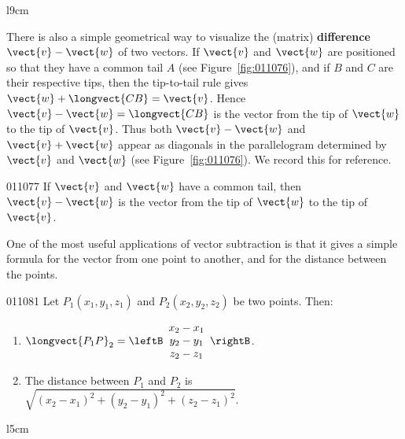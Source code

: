 \begin{wrapfigure}[7]{l}{9cm} 
\centering

\caption{\label{fig:011076}}
\end{wrapfigure}
There is also a simple geometrical way to visualize the (matrix) \textbf{difference} $\vect{v} - \vect{w}$ of two vectors. If $\vect{v}$ and $\vect{w}$ are positioned so that they have a common tail $A$ (see Figure~\ref{fig:011076}), and if $B$ and $C$ are their respective tips, then the tip-to-tail rule gives $\vect{w} + \longvect{CB} = \vect{v}$. Hence $\vect{v} - \vect{w} = \longvect{CB}$ is the vector from the tip of $\vect{w}$ to the tip of $\vect{v}$. Thus both $\vect{v} - \vect{w}$ and $\vect{v} + \vect{w}$ appear as diagonals in the parallelogram determined by $\vect{v}$ and $\vect{w}$ (see Figure~\ref{fig:011076}). We record this for reference.

\begin{theorem}{}{011077}
If $\vect{v}$ and $\vect{w}$ have a common tail, then $\vect{v} - \vect{w}$ is the vector from the tip of $\vect{w}$ to the tip of $\vect{v}$.
\end{theorem}

One of the most useful applications of vector subtraction is that it gives a  simple formula for the vector from one point to another, and for the  distance between the points. 


\begin{theorem}{}{011081}
Let $P_{1}(x_{1}, y_{1}, z_{1})$ and $P_{2}(x_{2}, y_{2}, z_{2})$ be two points. Then:

\begin{enumerate}
\item  
$\longvect{P_{1}P}_{2} = \leftB
\begin{array}{c}
x_{2} - x_{1} \\
y_{2} - y_{1} \\
z_{2} - z_{1}   
\end{array}
\rightB$.


\item The distance between $P_{1}$ and $P_{2}$ is $\sqrt{(x_{2} - x_{1})^2 + (y_{2} - y_{1})^2 + (z_{2} - z_{1})^2}$.

\end{enumerate}
\end{theorem}

\begin{wrapfigure}[8]{l}{5cm} 
\centering

\caption{\label{fig:011110}}
\end{wrapfigure}

